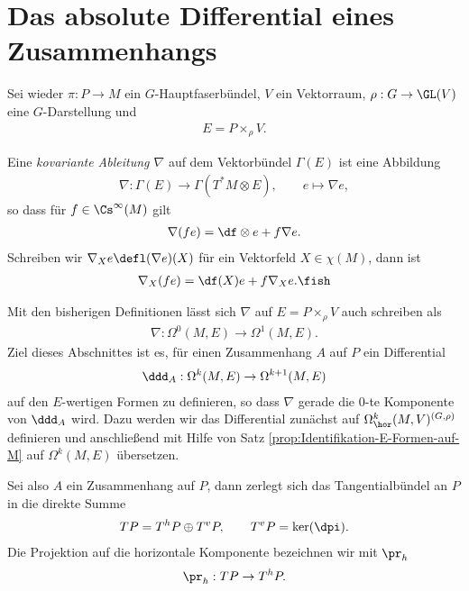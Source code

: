 \documentclass[%
	paper=a5,%
	fleqn,%
	DIV=18,%
	BCOR=0mm,
	fontsize=11pt,
	titlepage=false,%
	bibliography=totoc,
	DIV=18,%
	twoside=true,
	pdftitle=Riemannsche Geometrie,
	pdfauthor=Uwe Semmelmann,
	numbers=noendperiod]%
	{scrbook}
\begin{document}
\section{Das absolute Differential eines Zusammenhangs}

Sei wieder $\pi: P\to M$ ein $G$-Hauptfaserbündel, $V$ ein Vektorraum, $\rho:
G\to \GL(V)$ eine $G$-Darstellung und
\begin{align*}
E = P\times_\rho V.
\end{align*}

\begin{defn}
Eine \emph{kovariante Ableitung $\nabla$} auf dem Vektorbündel $\Gamma(E)$ ist
eine Abbildung
\begin{align*}
\nabla : \Gamma(E)\to \Gamma(T^*M\otimes E),\qquad
e \mapsto \nabla e,
\end{align*}
so dass für $f\in\Cs^\infty(M)$ gilt
\begin{align*}
\nabla (fe) = \df\otimes e + f\nabla e.
\end{align*}
Schreiben wir $\nabla_X e \defl (\nabla e)(X)$ für ein Vektorfeld $X\in\chi(M)$,
dann ist
\begin{align*}
\nabla_X(fe) = \df(X)e + f \nabla_X e.\fish
\end{align*} 
\end{defn}

Mit den bisherigen Definitionen lässt sich $\nabla$ auf $E=P\times_\rho V$ auch
schreiben als
\begin{align*}
\nabla: \Omega^0(M,E) \to \Omega^1(M,E).
\end{align*}
Ziel dieses Abschnittes ist es, für einen Zusammenhang $A$ auf $P$ ein
Differential
\begin{align*}
\ddd_A : \Omega^k(M,E)\to \Omega^{k+1}(M,E)
\end{align*}
auf den $E$-wertigen Formen zu definieren, so dass $\nabla$ gerade die $0$-te
Komponente von $\ddd_A$ wird. Dazu werden wir das Differential zunächst
auf $\Omega_\hor^k(M,V)^{(G,\rho)}$ definieren und anschließend mit Hilfe von
Satz \ref{prop:Identifikation-E-Formen-auf-M} auf $\Omega^k(M,E)$ übersetzen.

Sei also $A$ ein Zusammenhang auf $P$, dann zerlegt sich das Tangentialbündel an
$P$ in die direkte Summe
\begin{align*}
TP = T^hP\oplus T^vP,\qquad T^vP = \ker(\dpi).
\end{align*}
Die Projektion auf die horizontale Komponente bezeichnen wir mit $\pr_h$
\begin{align*}
\pr_h : TP \to T^hP.
\end{align*}
\end{document}
